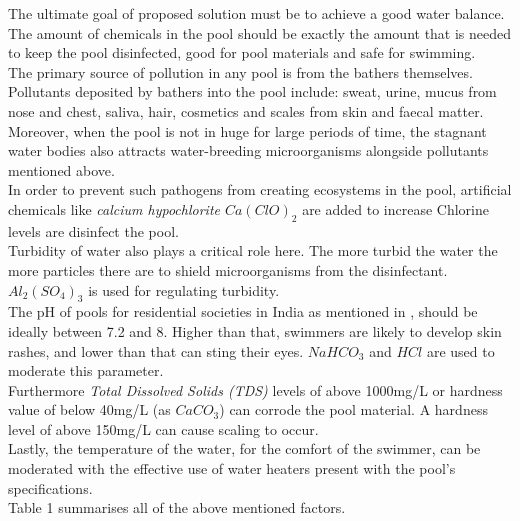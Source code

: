 \documentclass[12pt]{article}
\begin{document}
The ultimate goal of proposed solution must be to achieve a good water balance. The amount of chemicals in the pool should be exactly the amount that is needed to keep the pool disinfected, good for pool materials and safe for swimming.\\
The primary source of pollution in any pool is from the bathers themselves. Pollutants deposited by bathers into the pool include: sweat, urine, mucus from nose and chest, saliva, hair, cosmetics and scales from skin and faecal matter.
Moreover, when the pool is not in huge for large periods of time, the stagnant water bodies also attracts water-breeding microorganisms alongside pollutants mentioned above.\\
In order to prevent such pathogens from creating ecosystems in the pool, artificial chemicals like \textit{calcium hypochlorite $Ca(ClO)_2$} are added to increase Chlorine levels are disinfect the pool.\\
Turbidity of water also plays a critical role here. The more turbid the water the more particles there are to shield microorganisms from the disinfectant. $Al_2(SO_4)_3$ is used for regulating turbidity.\\
The pH of pools for residential societies in India as mentioned in \cite{myGate}, should be ideally between 7.2 and 8. Higher than that, swimmers are likely to develop skin rashes, and lower than that can sting their eyes. $NaHCO_3$ and $HCl$ are used to moderate this parameter.\\
Furthermore \textit{Total Dissolved Solids (TDS)} levels of above 1000mg/L or hardness value of below 40mg/L (as $CaCO_3$) can corrode the pool material. A hardness level of above 150mg/L can cause scaling to occur.\\
Lastly, the temperature of the water, for the comfort of the swimmer, can be moderated with the effective use of water heaters present with the pool's specifications.\\
Table 1 summarises all of the above mentioned factors.
\end{document}
